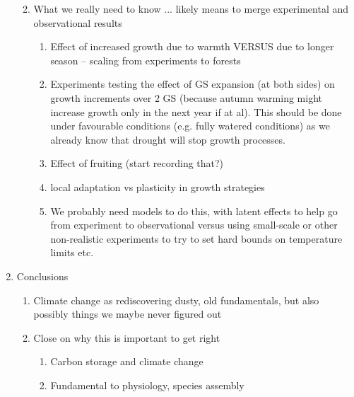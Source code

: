 \documentclass[11pt,letter]{article}
\begin{document}
\begin{enumerate}
\begin{enumerate}
\begin{enumerate}
\end{enumerate}
\item What we really need to know ... likely means to merge experimental and observational results
\begin{enumerate}
\item Effect of increased growth due to warmth VERSUS due to longer season -- scaling from experiments to forests
\item Experiments testing the effect of GS expansion (at both sides) on growth increments over 2 GS (because autumn warming might increase growth only in the next year if at al). This should be done under favourable conditions (e.g. fully watered conditions) as we already know that drought will stop growth processes.
\item Effect of fruiting (start recording that?)
\item local adaptation vs plasticity in growth strategies 
\item We probably need models to do this, with latent effects to help go from experiment to observational versus using small-scale or other non-realistic experiments to try to set hard bounds on temperature limits etc. 
\end{enumerate}
\end{enumerate}
\item Conclusions
\begin{enumerate}
\item Climate change as rediscovering dusty, old fundamentals, but also possibly things we maybe never figured out
\item Close on why this is important to get right
\begin{enumerate}
\item Carbon storage and climate change
\item Fundamental to physiology, species assembly
\end{enumerate}
\end{enumerate}
\end{enumerate}
\end{document}
